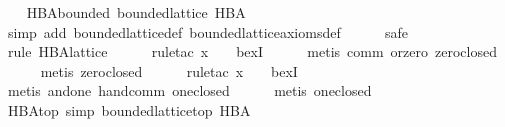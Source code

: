 \begin{isabellebody}
\endisatagproof
{\isafoldproof}%
%
\isadelimproof
\isanewline
%
\endisadelimproof
\isanewline
\ \ \isamarkupfalse%
\ HBA{}bounded{}\ {}bounded{}lattice\ HBA{}\isanewline
%
\isadelimproof
\ \ \ \ %
\endisadelimproof
%
\isatagproof
{}\isamarkupfalse%
\ {}simp\ add{}\ bounded{}lattice{}def\ bounded{}lattice{}axioms{}def{}\isanewline
\ \ \ \ \isamarkupfalse%
\ safe\isanewline
\ \ \ \ \isamarkupfalse%
\ {}rule\ HBA{}lattice{}\isanewline
\ \ \ \ \isamarkupfalse%
\ {}rule{}tac\ x\ {}\ {}\ \ bexI{}\isanewline
\ \ \ \ \isamarkupfalse%
\ {}metis\ comm\ or{}zero\ zero{}closed{}\isanewline
\ \ \ \ \isamarkupfalse%
\ {}metis\ zero{}closed{}\isanewline
\ \ \ \ \isamarkupfalse%
\ {}rule{}tac\ x\ {}\ {}\ \ bexI{}\isanewline
\ \ \ \ \isamarkupfalse%
\ {}metis\ and{}one\ hand{}comm\ one{}closed{}\isanewline
\ \ \ \ \isamarkupfalse%
\ {}metis\ one{}closed{}%
\endisatagproof
{\isafoldproof}%
%
\isadelimproof
\isanewline
%
\endisadelimproof
\isanewline
\ \ \isamarkupfalse%
\ HBA{}top\ {}simp{}{}\ {}bounded{}lattice{}top\ HBA\ {}\ {}{}\isanewline

\end{isabellebody}
